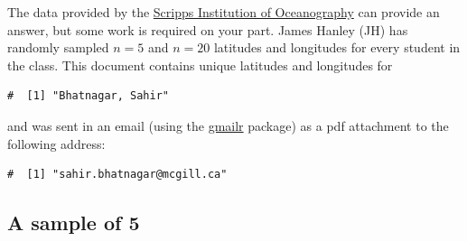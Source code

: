 \documentclass[letterpaper,12pt,twoside,]{pinp}
\begin{document}
The data provided by the
\href{https://topex.ucsd.edu/cgi-bin/get_srtm30.cgi}{Scripps Institution
of Oceanography} can provide an answer, but some work is required on
your part. James Hanley (JH) has randomly sampled \(n=5\) and \(n=20\)
latitudes and longitudes for every student in the class. This document
contains unique latitudes and longitudes for

\begin{Shaded}
\begin{Highlighting}[]
\OperatorTok{$}
\end{Highlighting}
\end{Shaded}

\begin{ShadedResult}
\begin{verbatim}
#  [1] "Bhatnagar, Sahir"
\end{verbatim}
\end{ShadedResult}

and was sent in an email (using the
\href{https://cran.r-project.org/package=gmailr}{gmailr} package) as a
pdf attachment to the following address:

\begin{Shaded}
\begin{Highlighting}[]
\OperatorTok{$}
\end{Highlighting}
\end{Shaded}

\begin{ShadedResult}
\begin{verbatim}
#  [1] "sahir.bhatnagar@mcgill.ca"
\end{verbatim}
\end{ShadedResult}

\begin{Shaded}
\begin{Highlighting}[]
\OperatorTok{$}
\OperatorTok{$}\NormalTok{lon[params}\OperatorTok{$}\NormalTok{ind],}\NormalTok{)}
\end{Highlighting}
\end{Shaded}

\hypertarget{a-sample-of-5}{%
\subsection*{A sample of 5}\label{a-sample-of-5}}
\end{document}
